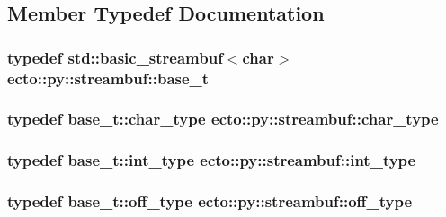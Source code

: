 \subsection{Member Typedef Documentation}
\hypertarget{classecto_1_1py_1_1streambuf_ac46c69e7d213fec69f80d1943389366c}{
\subsubsection[{base\-\_\-t}]{\setlength{\rightskip}{0pt plus 5cm}typedef std\-::basic\-\_\-streambuf$<$char$>$ {\bf ecto\-::py\-::streambuf\-::base\-\_\-t}\hspace{0.3cm}{\ttfamily [private]}}}\label{classecto_1_1py_1_1streambuf_ac46c69e7d213fec69f80d1943389366c}
\hypertarget{classecto_1_1py_1_1streambuf_acd255be6a50678c600c431c5bea7bc7b}{
\subsubsection[{char\-\_\-type}]{\setlength{\rightskip}{0pt plus 5cm}typedef base\-\_\-t\-::char\-\_\-type {\bf ecto\-::py\-::streambuf\-::char\-\_\-type}}}\label{classecto_1_1py_1_1streambuf_acd255be6a50678c600c431c5bea7bc7b}
\hypertarget{classecto_1_1py_1_1streambuf_a1bfd3d3f54b7b91a5ea54f980436a617}{
\subsubsection[{int\-\_\-type}]{\setlength{\rightskip}{0pt plus 5cm}typedef base\-\_\-t\-::int\-\_\-type {\bf ecto\-::py\-::streambuf\-::int\-\_\-type}}}\label{classecto_1_1py_1_1streambuf_a1bfd3d3f54b7b91a5ea54f980436a617}
\hypertarget{classecto_1_1py_1_1streambuf_aa01772d1599fc51089a209a69fcab7c7}{
\subsubsection[{off\-\_\-type}]{\setlength{\rightskip}{0pt plus 5cm}typedef base\-\_\-t\-::off\-\_\-type {\bf ecto\-::py\-::streambuf\-::off\-\_\-type}}}\label{classecto_1_1py_1_1streambuf_aa01772d1599fc51089a209a69fcab7c7}
